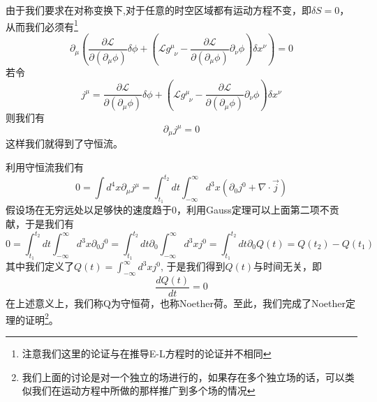由于我们要求在对称变换下,对于任意的时空区域都有运动方程不变，即$\delta S=0$，从而我们必须有\footnote{注意我们这里的论证与在推导E-L方程时的论证并不相同}
\begin{equation}
    \partial_{\mu}\left(\frac{\partial \mathcal{L}}{\partial (\partial_{\mu}\phi)} \delta \phi +\left(\mathcal{L}g^{\mu}_{\;\;\nu}- \frac{\partial \mathcal{L}}{\partial (\partial_{\mu}\phi)} \partial_{\nu} \phi\right)\delta x^{\nu}\right)=0
\end{equation}
若令
\begin{equation}
    j^{\mu}=\frac{\partial \mathcal{L}}{\partial (\partial_{\mu}\phi)} \delta \phi +\left(\mathcal{L}g^{\mu}_{\;\;\nu}- \frac{\partial \mathcal{L}}{\partial (\partial_{\mu}\phi)} \partial_{\nu} \phi\right)\delta x^{\nu}
\end{equation}
则我们有
\begin{equation}
    \partial_{\mu}j^{\mu}=0
\end{equation}
这样我们就得到了守恒流。

利用守恒流我们有
\begin{equation}
    0=\int d^{4}x \partial_{\mu}j^{\mu}=\int_{t_{1}}^{t_{2}}dt\int^{\infty}_{-\infty}d^{3}x \left(\partial_{0}j^{0}+\nabla\cdot\vec{j}\right)
\end{equation}
假设场在无穷远处以足够快的速度趋于0，利用Gauss定理可以上面第二项不贡献，于是我们有
\begin{equation}
    0=\int_{t_{1}}^{t_{2}}dt\int^{\infty}_{-\infty}d^{3}x \partial_{0}j^{0}=\int_{t_{1}}^{t_{2}}dt\partial_{0}\int^{\infty}_{-\infty}d^{3}x j^{0}=\int_{t_{1}}^{t_{2}}dt\partial_{0}Q(t)=Q(t_{2})-Q(t_{1})
\end{equation}
其中我们定义了$Q(t)=\int^{\infty}_{-\infty}d^{3}x j^{0}$,
于是我们得到$Q(t)$与时间无关，即
\begin{equation}
    \frac{dQ(t)}{dt}=0
\end{equation}
在上述意义上，我们称Q为守恒荷，也称Noether荷。至此，我们完成了Noether定理的证明\footnote{我们上面的讨论是对一个独立的场进行的，如果存在多个独立场的话，可以类似我们在运动方程中所做的那样推广到多个场的情况}。

